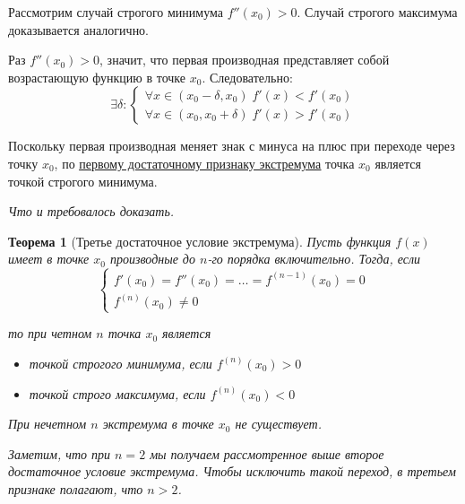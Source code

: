 \documentclass[a4paper,12pt,oneside]{extbook}
\newcommand{\newpar}{$ $\par\nobreak\ignorespaces}
\theoremstyle{numbered}
\theoremstyle{unnumbered}
\newtheorem*{theorem*}{Теорема}
\theoremstyle{named}
\theoremstyle{unnumbered}
\theoremstyle{named}
\theoremstyle{named}
\theoremstyle{named}
\renewenvironment{proof}[1][]{\breakenv[Доказательство]{\if\relax\detokenize{#1}\relax\else\;\fi}{\textbf{#1}}}{\smallskip\newpar \hfill\textit{Что и требовалось доказать.}}
\newcommand{\plink}[2]{\hyperref[#1]{\color{blue}\underline{#2}}}
\begin{document}
\begin{proof}
    Рассмотрим случай строгого минимума \(f''(x_0) > 0\). Случай строгого максимума доказывается аналогично.

    Раз \(f''(x_0) > 0\), значит, что первая производная представляет собой возрастающую функцию в точке \(x_0\). Следовательно:
    \[
        \exists \delta:
        \begin{cases}
            \forall x \in (x_0 - \delta, x_0) \; f'(x) < f'(x_0) \\
            \forall x \in (x_0, x_0 + \delta) \; f'(x) > f'(x_0)
        \end{cases}
    \]

    Поскольку первая производная меняет знак с минуса на плюс при переходе через точку \(x_0\), по \plink{theorem:Первое достаточное условие экстремума}{первому достаточному признаку экстремума} точка \(x_0\) является точкой строгого минимума.
\end{proof}

\begin{theorem*}[Третье достаточное условие экстремума]
    Пусть функция \(f(x)\) имеет в точке \(x_0\) производные до \(n\)-го порядка включительно. Тогда, если
    \[
        \begin{cases}
            f'(x_0) = f''(x_0) = \ldots = f^{(n - 1)}(x_0) = 0 \\
            f^{(n)}(x_0) \neq 0
        \end{cases}
    \]

    то при четном \(n\) точка \(x_0\) является
    \begin{itemize}
        \item {точкой строгого минимума, если \(f^{(n)}(x_0) > 0\)}
        \item {точкой строго максимума, если \(f^{(n)}(x_0) < 0\)}
    \end{itemize}

    При нечетном \(n\) экстремума в точке \(x_0\) не существует.

    Заметим, что при \(n = 2\) мы получаем рассмотренное выше второе достаточное условие экстремума. Чтобы исключить такой переход, в третьем признаке полагают, что \(n > 2\).
\end{theorem*}
\end{document}

